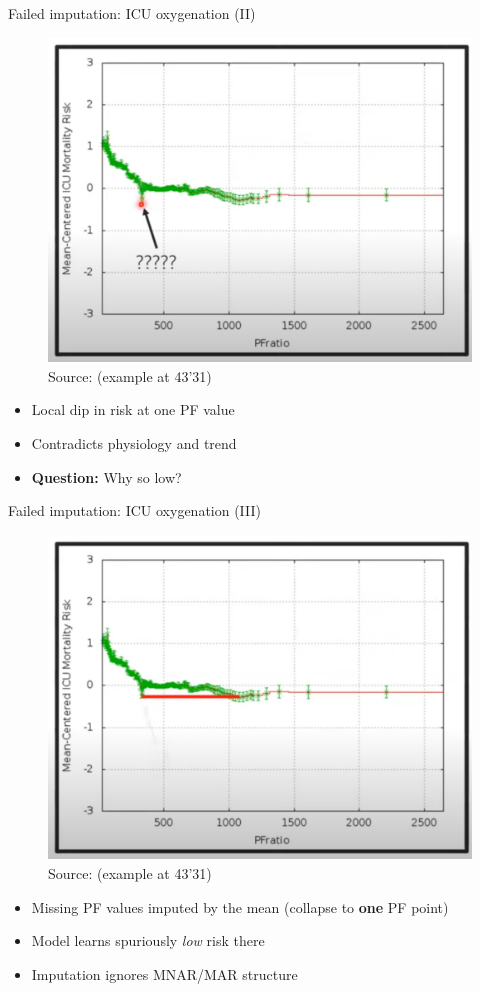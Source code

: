 \documentclass[11pt,compress,t,notes=noshow, xcolor=table]{beamer}
\begin{document}
\begin{frame}{Failed imputation: ICU oxygenation (II)}
\begin{figure}
  \centering
  \includegraphics[width=0.6\linewidth]{figure_man/Screenshot from 2025-06-03 22-38-27.png}
  \\\scriptsize Source:  (example at 43'31)
\end{figure}
\begin{itemize}
  \item Local \alert{dip} in risk at one PF value
  \item Contradicts physiology and trend
  \item \textbf{Question:} Why so low?
\end{itemize}
\end{frame}

\begin{frame}{Failed imputation: ICU oxygenation (III)}
\begin{figure}
  \centering
  \includegraphics[width=0.6\linewidth]{figure_man/Screenshot from 2025-06-03 22-38-34.png}
  \\\scriptsize Source:  (example at 43'31)
\end{figure}
\begin{itemize}
  \item Missing PF values \alert{imputed by the mean} (collapse to \textbf{one} PF point)
  \item Model learns spuriously \emph{low} risk there %
  \item Imputation ignores \alert{MNAR/MAR} structure
\end{itemize}
\end{frame}
\end{document}
